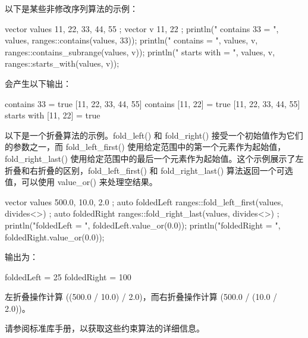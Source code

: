 以下是某些非修改序列算法的示例：

\begin{cpp}
vector values { 11, 22, 33, 44, 55 };
vector v { 11, 22 };
println("{} contains 33 = {}", values, ranges::contains(values, 33));
println("{} contains {} = {}", values, v, ranges::contains_subrange(values, v));
println("{} starts with {} = {}", values, v, ranges::starts_with(values, v));
\end{cpp}

会产生以下输出：

\begin{shell}
[11, 22, 33, 44, 55] contains 33 = true
[11, 22, 33, 44, 55] contains [11, 22] = true
[11, 22, 33, 44, 55] starts with [11, 22] = true
\end{shell}

以下是一个折叠算法的示例。fold\_left() 和 fold\_right() 接受一个初始值作为它们的参数之一，而 fold\_left\_first() 使用给定范围中的第一个元素作为起始值，fold\_right\_last() 使用给定范围中的最后一个元素作为起始值。这个示例展示了左折叠和右折叠的区别，fold\_left\_first() 和 fold\_right\_last() 算法返回一个可选值，可以使用 value\_or() 来处理空结果。

\begin{cpp}
vector values { 500.0, 10.0, 2.0 };
auto foldedLeft { ranges::fold_left_first(values, divides<>{}) };
auto foldedRight { ranges::fold_right_last(values, divides<>{}) };
println("foldedLeft = {}", foldedLeft.value_or(0.0));
println("foldedRight = {}", foldedRight.value_or(0.0));
\end{cpp}

输出为：

\begin{shell}
foldedLeft = 25
foldedRight = 100
\end{shell}

左折叠操作计算 ((500.0 / 10.0) / 2.0)，而右折叠操作计算 (500.0 / (10.0 / 2.0))。

请参阅标准库手册，以获取这些约束算法的详细信息。











